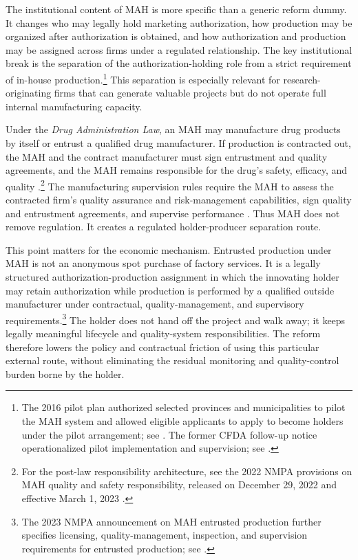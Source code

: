 \documentclass[12pt]{article}
\newcommand{\1}{\mathbf{1}}
\begin{document}
The institutional content of MAH is more specific than a generic reform dummy. It changes who may legally hold marketing authorization, how production may be organized after authorization is obtained, and how authorization and production may be assigned across firms under a regulated relationship. The key institutional break is the separation of the authorization-holding role from a strict requirement of in-house production.\footnote{The 2016 pilot plan authorized selected provinces and municipalities to pilot the MAH system and allowed eligible applicants to apply to become holders under the pilot arrangement; see \citet{StateCouncilMAHPilot2016}. The former CFDA follow-up notice operationalized pilot implementation and supervision; see \citet{CFDAMAHImplementation2016}.} This separation is especially relevant for research-originating firms that can generate valuable projects but do not operate full internal manufacturing capacity.

Under the \textit{Drug Administration Law}, an MAH may manufacture drug products by itself or entrust a qualified drug manufacturer. If production is contracted out, the MAH and the contract manufacturer must sign entrustment and quality agreements, and the MAH remains responsible for the drug's safety, efficacy, and quality \citep{DrugAdministrationLaw2019}.\footnote{For the post-law responsibility architecture, see the 2022 NMPA provisions on MAH quality and safety responsibility, released on December 29, 2022 and effective March 1, 2023 \citep{NMPAHolderResponsibility2022}.} The manufacturing supervision rules require the MAH to assess the contracted firm's quality assurance and risk-management capabilities, sign quality and entrustment agreements, and supervise performance \citep{NMPAManufacturing2022}. Thus MAH does not remove regulation. It creates a regulated holder-producer separation route.

This point matters for the economic mechanism. Entrusted production under MAH is not an anonymous spot purchase of factory services. It is a legally structured authorization-production assignment in which the innovating holder may retain authorization while production is performed by a qualified outside manufacturer under contractual, quality-management, and supervisory requirements.\footnote{The 2023 NMPA announcement on MAH entrusted production further specifies licensing, quality-management, inspection, and supervision requirements for entrusted production; see \citet{NMPAEntrustedProduction2023}.} The holder does not hand off the project and walk away; it keeps legally meaningful lifecycle and quality-system responsibilities. The reform therefore lowers the policy and contractual friction of using this particular external route, without eliminating the residual monitoring and quality-control burden borne by the holder.
\end{document}
